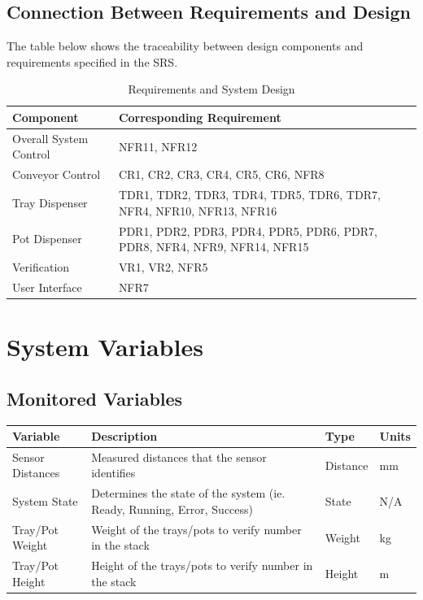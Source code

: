 \documentclass[12pt, titlepage]{article}
\begin{document}
\subsection{Connection Between Requirements and Design} \label{SecConnection}

  The table below shows the traceability between design components and requirements specified in the SRS.
  
\begin{table}[H]
\caption{Requirements and System Design}
\begin{tabularx}{\textwidth}{|l|X|}
\hline
\textbf{Component} & \textbf{Corresponding Requirement} \\ \hline
Overall System Control  & NFR11, NFR12 \\ \hline
Conveyor Control   & CR1, CR2, CR3, CR4, CR5, CR6, NFR8 \\ \hline
Tray Dispenser   & TDR1, TDR2, TDR3, TDR4, TDR5, TDR6, TDR7, NFR4, NFR10, NFR13, NFR16 \\ \hline
Pot Dispenser   &  PDR1, PDR2, PDR3, PDR4, PDR5, PDR6, PDR7, PDR8, NFR4, NFR9, NFR14, NFR15  \\ \hline
Verification   &  VR1, VR2, NFR5 \\ \hline
User Interface  &  NFR7 \\ \hline
\end{tabularx}
\end{table}

\section{System Variables}


\subsection{Monitored Variables}

\begin{tabular}{ |p{3cm}|p{9cm}|p{2cm}|p{1cm}| }
  \hline
  Variable & Description & Type & Units\\
  \hline
  Sensor Distances & Measured distances that the sensor identifies
   & Distance & mm\\
  \hline
  System State & Determines the state of the system (ie. Ready, Running, Error, Success)
   & State &  N/A\\
  \hline
  Tray/Pot Weight & Weight of the trays/pots to verify number in the stack
   & Weight & kg\\
  \hline
  Tray/Pot Height & Height of the trays/pots to verify number in the stack
   & Height & m\\
  
  \hline
 \end{tabular}\\\\
\end{document}
